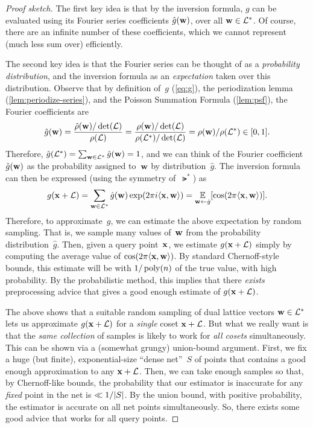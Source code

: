 \documentclass[11pt]{article}
\begin{document}
\begin{proof}[Proof sketch]
  The first key idea is that by the inversion formula, $g$ can be
  evaluated using its Fourier series coefficients $\hat{g}(\mathbf{w})$,
  over all $\mathbf{w} \in \mathcal{L}^{*}$. Of course, there are an infinite
  number of these coefficients, which we cannot represent (much less
  sum over) efficiently.

  The second key idea is that the Fourier series can be thought of as
  a \emph{probability distribution}, and the inversion formula as an
  \emph{expectation} taken over this distribution. Observe that by
  definition of~$g$ (\cref{eq:g}), the periodization lemma
  (\cref{lem:periodize-series}), and the Poisson Summation Formula
  (\cref{lem:psf}), the Fourier coefficients are
  \[ \hat{g}(\mathbf{w}) = \frac{\hat{\rho}(\mathbf{w}) /
      \det(\mathcal{L})}{\rho(\mathcal{L})} =
    \frac{\rho(\mathbf{w})/\det(\mathcal{L})}{\rho(\mathcal{L}^{*})/\det(\mathcal{L})} =
    \rho(\mathbf{w}) / \rho(\mathcal{L}^{*}) \in [0,1]. \] Therefore,
  $\hat{g}(\mathcal{L}^{*}) = \sum_{\mathbf{w} \in \mathcal{L}^{*}} \hat{g}(\mathbf{w}) = 1$,
  and we can think of the Fourier coefficient~$\hat{g}(\mathbf{w})$ as the
  probability assigned to~$\mathbf{w}$ by distribution~$\hat{g}$. The
  inversion formula can then be expressed (using the symmetry
  of~$\lat^{*}$) as
  \[ g(\mathbf{x} + \mathcal{L}) = \sum_{\mathbf{w} \in \mathcal{L}^{*}} \hat{g}(\mathbf{w})
    \exp(2\pi i \langle\mathbf{x},\mathbf{w}\rangle) = \operatorname*{\mathbb{E}}_{\mathbf{w} \gets
      \hat{g}}[\cos(2\pi \langle\mathbf{x},\mathbf{w}\rangle)] . \] Therefore, to
  approximate~$g$, we can estimate the above expectation by random
  sampling. That is, we sample many values of~$\mathbf{w}$ from the
  probability distribution~$\hat{g}$. Then, given a query
  point~$\mathbf{x}$, we estimate $g(\mathbf{x} + \mathcal{L})$ simply by computing the
  average value of $\cos(2 \pi \langle\mathbf{x},\mathbf{w}\rangle)$. By standard
  Chernoff-style bounds, this estimate will be with $1/\operatorname{poly}(n)$ of
  the true value, with high probability. By the probabilistic method,
  this implies that there \emph{exists} preprocessing advice that
  gives a good enough estimate of $g(\mathbf{x}+\mathcal{L})$.

  The above shows that a suitable random sampling of dual lattice
  vectors $\mathbf{w} \in \mathcal{L}^{*}$ lets us approximate $g(\mathbf{x} + \mathcal{L})$
  for a \emph{single} coset $\mathbf{x} + \mathcal{L}$. But what we really want is
  that the \emph{same collection} of samples is likely to work for
  \emph{all cosets} simultaneously. This can be shown via a (somewhat
  grungy) union-bound argument. First, we fix a huge (but finite),
  exponential-size ``dense net''~$S$ of points that contains a good
  enough approximation to any $\mathbf{x} + \mathcal{L}$. Then, we can take enough
  samples so that, by Chernoff-like bounds, the probability that our
  estimator is inaccurate for any \emph{fixed} point in the net is
  $\ll 1/\lvert S\rvert$. By the union bound, with positive probability, the
  estimator is accurate on all net points simultaneously. So, there
  exists some good advice that works for all query points.
\end{proof}



\end{document}
